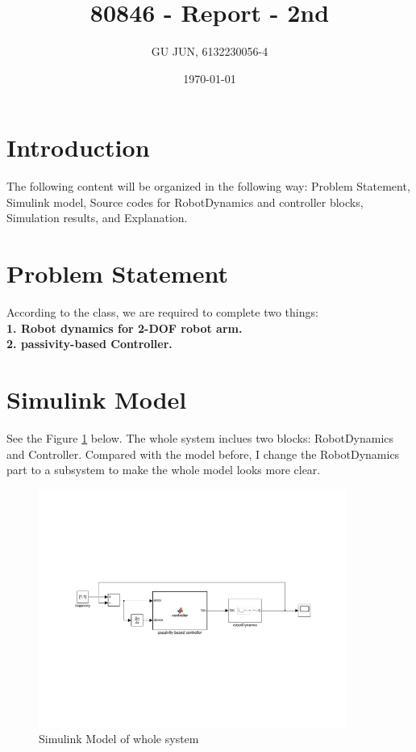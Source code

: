 \documentclass{article}
\title{80846 - Report - 2nd}
\author{GU JUN, 6132230056-4}
\date{\today}
\begin{document}
\maketitle

\section*{Introduction}

The following content will be organized in the following way: Problem Statement, Simulink model, Source codes for RobotDynamics and controller blocks, Simulation results, and Explanation.

\section*{Problem Statement}

According to the class, we are required to complete two things: \\
\textbf{1. Robot dynamics for 2-DOF robot arm.} \\
\textbf{2. passivity-based Controller.}

\section{Simulink Model}
See the Figure \ref{fig:model} below. The whole system inclues two blocks: RobotDynamics and Controller.
Compared with the model before, I change the RobotDynamics part to a subsystem to make the whole model looks more clear.\\
\begin{figure}[ht]
    \centering
    \includegraphics[width=0.9\textwidth]{figures/model.pdf}
    \caption{Simulink Model of whole system}
    \label{fig:model}
\end{figure}
\end{document}
